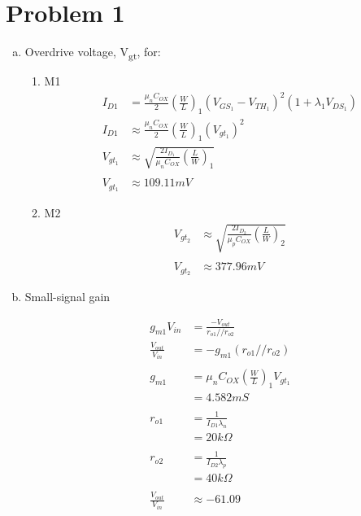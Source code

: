 \documentclass{article}
\begin{document}
\section{Problem 1}
\label{sec:org2d96ce6}
\begin{enumerate}[(a)]
\item Overdrive voltage, V\textsubscript{gt}, for:
\begin{enumerate}[1.]
\item M1
\begin{equation*}
\begin{aligned}
I_{D1} &= \frac{\mu_{n}C_{OX}}{2}(\frac{W}{L})_{1}(V_{GS_{1}} - V_{TH_{1}})^2(1 + \lambda_{1}V_{DS_{1}}) \\
I_{D1} &\approx \frac{\mu_{n}C_{OX}}{2}(\frac{W}{L})_{1}(V_{gt_{1}})^2 \\
V_{gt_{1}} &\approx \sqrt{\frac{2 I_{D_{1}}}{\mu_{n}C_{OX}}(\frac{L}{W})_{1}} \\
\\
V_{gt_{1}} &\approx 109.11 mV
\end{aligned}
\end{equation*}

\item M2
\begin{equation*}
\begin{aligned}
V_{gt_{2}} &\approx \sqrt{\frac{2 I_{D_{2}}}{\mu_{p}C_{OX}}(\frac{L}{W})_{2}} \\
\\
V_{gt_{2}} &\approx 377.96 mV
\end{aligned}
\end{equation*}
\end{enumerate}

\item Small-signal gain

\begin{equation*}
\begin{aligned}
g_{m1}V_{in} &= \frac{-V_{out}}{r_{o1}//r_{o2}} \\
\frac{V_{out}}{V_{in}} &= -g_{m1}(r_{o1}//r_{o2}) \\
\\
g_{m1} &= \mu_{n}C_{OX} (\frac{W}{L})_{1} V_{gt_1} \\
&= 4.582 mS \\
\\
r_{o1} &= \frac{1}{I_{D1}\lambda_{n}} \\
&= 20 k\Omega \\
\\
r_{o2} &= \frac{1}{I_{D2}\lambda_{p}} \\
&= 40 k\Omega \\
\\
\frac{V_{out}}{V_{in}} &\approx -61.09 \\
\end{aligned}
\end{equation*}


\end{enumerate}
\end{document}
